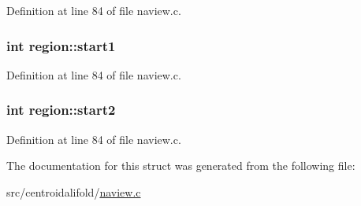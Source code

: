 Definition at line 84 of file naview.\+c.

\hypertarget{structregion_a9491ab5c4e5be6d5cef854f71a75cf19}{
\subsubsection[{start1}]{\setlength{\rightskip}{0pt plus 5cm}int region\+::start1}}\label{structregion_a9491ab5c4e5be6d5cef854f71a75cf19}


Definition at line 84 of file naview.\+c.

\hypertarget{structregion_a04cb81f51b93d18f3899b4172ea90dc2}{
\subsubsection[{start2}]{\setlength{\rightskip}{0pt plus 5cm}int region\+::start2}}\label{structregion_a04cb81f51b93d18f3899b4172ea90dc2}


Definition at line 84 of file naview.\+c.



The documentation for this struct was generated from the following file\+:\begin{DoxyCompactItemize}
\item 
src/centroidalifold/\hyperlink{naview_8c}{naview.\+c}\end{DoxyCompactItemize}
